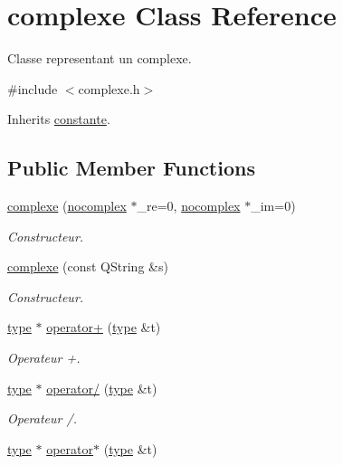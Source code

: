 \hypertarget{classcomplexe}{\section{complexe Class Reference}
\label{classcomplexe}
}


Classe representant un complexe.  




{\ttfamily \#include $<$complexe.\-h$>$}



Inherits \hyperlink{classconstante}{constante}.

\subsection*{Public Member Functions}
\begin{DoxyCompactItemize}
\item 
\hyperlink{classcomplexe_adc78653349f4c9d9c649fcc3dd40ee41}{complexe} (\hyperlink{classnocomplex}{nocomplex} $\ast$\-\_\-re=0, \hyperlink{classnocomplex}{nocomplex} $\ast$\-\_\-im=0)
\begin{DoxyCompactList}\small\item\em Constructeur. \end{DoxyCompactList}\item 
\hyperlink{classcomplexe_ac69dfe1d10fc970cab943111831c5e59}{complexe} (const Q\-String \&s)
\begin{DoxyCompactList}\small\item\em Constructeur. \end{DoxyCompactList}\item 
\hyperlink{classtype}{type} $\ast$ \hyperlink{classcomplexe_a9f98da0548d8b73f1f10f248061d196b}{operator+} (\hyperlink{classtype}{type} \&t)
\begin{DoxyCompactList}\small\item\em Operateur +. \end{DoxyCompactList}\item 
\hyperlink{classtype}{type} $\ast$ \hyperlink{classcomplexe_af2faf54f25b3e58699ecf1d0b6409603}{operator/} (\hyperlink{classtype}{type} \&t)
\begin{DoxyCompactList}\small\item\em Operateur /. \end{DoxyCompactList}\item 
\hyperlink{classtype}{type} $\ast$ \hyperlink{classcomplexe_a02371b6578996af8af11f260931259b4}{operator$\ast$} (\hyperlink{classtype}{type} \&t)

\end{DoxyCompactItemize}

